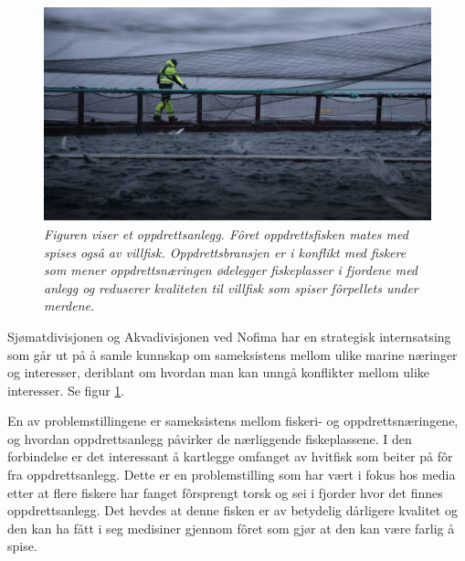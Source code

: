 \begin{figure} 
\begin{center} 
\includegraphics[scale=0.7]{figures/oppdrett}
\caption{\small \sl Figuren viser et oppdrettsanlegg. Fôret oppdrettsfisken mates med spises også av villfisk. Oppdrettsbransjen er i konflikt med fiskere som mener oppdrettsnæringen ødelegger fiskeplasser i fjordene med anlegg og reduserer kvaliteten til villfisk som spiser fôrpellets under merdene. \cite{Olsen m.fl. 2018} \label{fig:anlegg}} 
\end{center} 
\end{figure} 



Sjømatdivisjonen og Akvadivisjonen ved Nofima har en strategisk internsatsing som går ut på å samle kunnskap om sameksistens mellom ulike marine næringer og interesser, deriblant om hvordan man kan unngå konflikter mellom ulike interesser. Se figur \ref{fig:anlegg}. \cite{Robertsen 2020}

En av problemstillingene er sameksistens mellom fiskeri- og oppdrettsnæringene, og hvordan oppdrettsanlegg påvirker de nærliggende fiskeplassene. I den forbindelse er det interessant å kartlegge omfanget av hvitfisk som beiter på fôr fra oppdrettsanlegg. Dette er en problemstilling som har vært i fokus hos media etter at flere fiskere har fanget fôrsprengt torsk og sei i fjorder hvor det finnes oppdrettsanlegg. Det hevdes at denne fisken er av betydelig dårligere kvalitet og den kan ha fått i seg medisiner gjennom fôret som gjør at den kan være farlig å spise. \cite{Olsen 2019}


